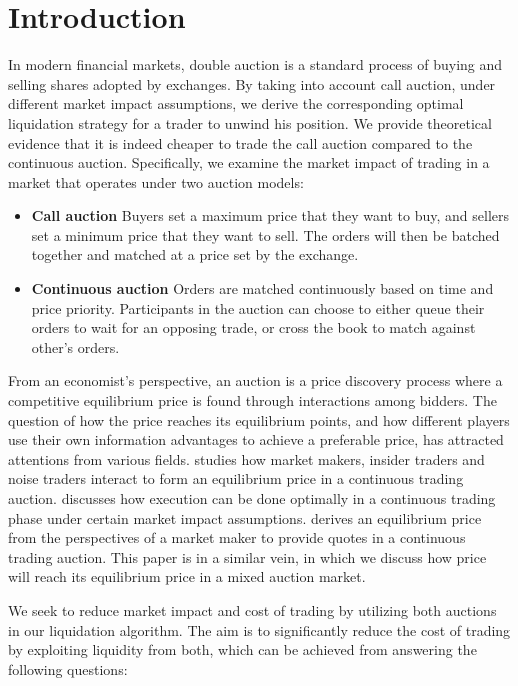 \section{Introduction}
In modern financial markets, double auction is a standard process of buying and selling shares adopted by exchanges. By taking into account call auction, under different market impact assumptions, we derive the corresponding optimal liquidation strategy for a trader to unwind his position. We provide theoretical evidence that it is indeed cheaper to trade the call auction compared to the continuous auction. Specifically, we examine the market impact of trading in a market that operates under two auction models:

\begin{itemize}
  \item \textbf{Call auction} Buyers set a maximum price that they want to buy, and sellers set a minimum price that they want to sell. The orders will then be batched together and matched at a price set by the exchange.
  \item \textbf{Continuous auction} Orders are matched continuously based on time and price priority. Participants in the auction can choose to either queue their orders to wait for an opposing trade, or cross the book to match against other's orders.
\end{itemize}

From an economist's perspective, an auction is a price discovery process where a competitive equilibrium price is found through interactions among bidders. The question of how the price reaches its equilibrium points, and how different players use their own information advantages to achieve a preferable price, has attracted attentions from various fields. \cite{Kyle1985} studies how market makers, insider traders and noise traders interact to form an equilibrium price in a continuous trading auction. \cite{Almgren2000} discusses how execution can be done optimally in a continuous trading phase under certain market impact assumptions. \cite{Avellaneda2008} derives an equilibrium price from the perspectives of a market maker to provide quotes in a continuous trading auction. This paper is in a similar vein, in which we discuss how price will reach its equilibrium price in a mixed auction market. 

We seek to reduce market impact and cost of trading by utilizing both auctions in our liquidation algorithm. The aim is to significantly reduce the cost of trading by exploiting liquidity from both, which can be achieved from answering the following questions:

